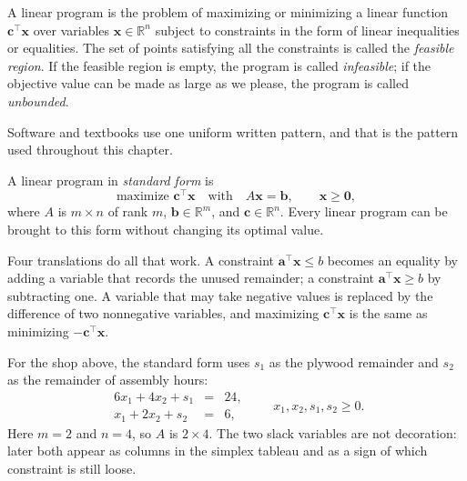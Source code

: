 \begin{definisi}
A linear program is the problem of maximizing or minimizing a linear function
$\mathbf{c}^{\top}\mathbf{x}$ over variables $\mathbf{x}\in\mathbb{R}^{n}$ subject to
constraints in the form of linear inequalities or equalities. The set of points satisfying all
the constraints is called the \emph{feasible region}. If the feasible region is empty, the
program is called \emph{infeasible}; if the objective value can be made as large as we please,
the program is called \emph{unbounded}.
\end{definisi}

Software and textbooks use one uniform written pattern, and that is the pattern used
throughout this chapter.

\begin{definisi}
A linear program in \emph{standard form} is
\[
  \text{maximize } \mathbf{c}^{\top}\mathbf{x}
  \quad\text{with}\quad A\mathbf{x}=\mathbf{b},\qquad \mathbf{x}\ge\mathbf{0},
\]
where $A$ is $m\times n$ of rank $m$, $\mathbf{b}\in\mathbb{R}^{m}$, and
$\mathbf{c}\in\mathbb{R}^{n}$. Every linear program can be brought to this form without
changing its optimal value.
\end{definisi}

Four translations do all that work. A constraint
$\mathbf{a}^{\top}\mathbf{x}\le b$ becomes an equality by adding a variable that records the
unused remainder; a constraint $\mathbf{a}^{\top}\mathbf{x}\ge b$ by subtracting one. A
variable that may take negative values is replaced by the difference of two nonnegative
variables, and maximizing $\mathbf{c}^{\top}\mathbf{x}$ is the same as minimizing
$-\mathbf{c}^{\top}\mathbf{x}$.


For the shop above, the standard form uses $s_{1}$ as the plywood remainder and $s_{2}$ as the
remainder of assembly hours:
\[
  \begin{array}{rcl}
    6x_{1}+4x_{2}+s_{1} &=& 24,\\
    x_{1}+2x_{2}+s_{2} &=& 6,
  \end{array}
  \qquad x_{1},x_{2},s_{1},s_{2}\ge0 .
\]
Here $m=2$ and $n=4$, so $A$ is $2\times4$. The two slack variables are not decoration: later
both appear as columns in the simplex tableau and as a sign of which constraint is still loose.

